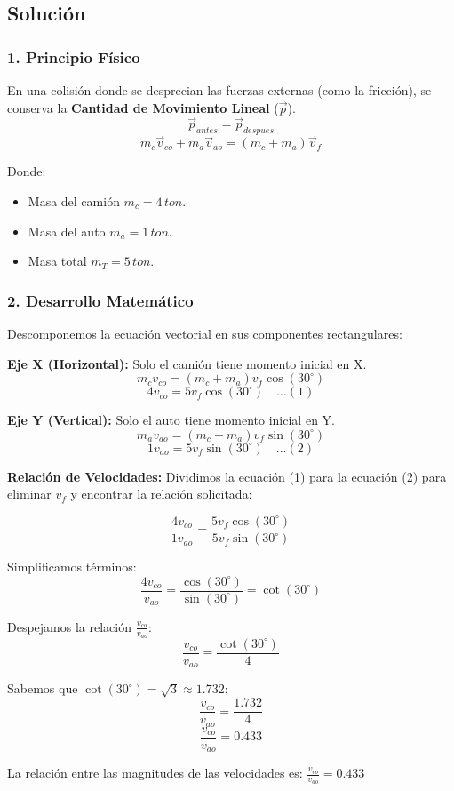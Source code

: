 \documentclass[12pt, a4paper]{article}
\begin{document}
\subsection*{Solución}

\subsubsection*{1. Principio Físico}
En una colisión donde se desprecian las fuerzas externas (como la fricción), se conserva la \textbf{Cantidad de Movimiento Lineal} ($\vec{p}$).
$$ \vec{p}_{antes} = \vec{p}_{despues} $$
$$ m_c \vec{v}_{co} + m_a \vec{v}_{ao} = (m_c + m_a) \vec{v}_f $$

Donde:
\begin{itemize}
    \item Masa del camión $m_c = 4 \, \si{ton}$.
    \item Masa del auto $m_a = 1 \, \si{ton}$.
    \item Masa total $m_T = 5 \, \si{ton}$.
\end{itemize}

\subsubsection*{2. Desarrollo Matemático}

Descomponemos la ecuación vectorial en sus componentes rectangulares:

\textbf{Eje X (Horizontal):}
Solo el camión tiene momento inicial en X.
$$ m_c v_{co} = (m_c + m_a) v_f \cos(30^\circ) $$
$$ 4 v_{co} = 5 v_f \cos(30^\circ) \quad \dots(1) $$

\textbf{Eje Y (Vertical):}
Solo el auto tiene momento inicial en Y.
$$ m_a v_{ao} = (m_c + m_a) v_f \sin(30^\circ) $$
$$ 1 v_{ao} = 5 v_f \sin(30^\circ) \quad \dots(2) $$

\textbf{Relación de Velocidades:}
Dividimos la ecuación (1) para la ecuación (2) para eliminar $v_f$ y encontrar la relación solicitada:

$$ \frac{4 v_{co}}{1 v_{ao}} = \frac{5 v_f \cos(30^\circ)}{5 v_f \sin(30^\circ)} $$

Simplificamos términos:
$$ \frac{4 v_{co}}{v_{ao}} = \frac{\cos(30^\circ)}{\sin(30^\circ)} = \cot(30^\circ) $$

Despejamos la relación $\frac{v_{co}}{v_{ao}}$:
$$ \frac{v_{co}}{v_{ao}} = \frac{\cot(30^\circ)}{4} $$

Sabemos que $\cot(30^\circ) = \sqrt{3} \approx 1.732$:
$$ \frac{v_{co}}{v_{ao}} = \frac{1.732}{4} $$
$$ \frac{v_{co}}{v_{ao}} = 0.433 $$

\begin{tcolorbox}[colback=green!5!white, colframe=green!50!black, title=Respuesta Final]
La relación entre las magnitudes de las velocidades es:
\centering \Large $\frac{v_{co}}{v_{ao}} = 0.433$
\end{tcolorbox}
\end{document}
